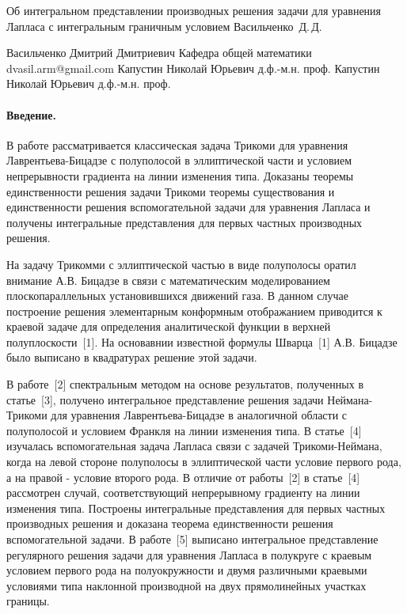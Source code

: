 \begin{vkrthesis}%
{Об интегральном представлении производных решения задачи для уравнения Лапласа с интегральным граничным условием}%
{Васильченко~Д.\,Д.}%

\VKRAuthorDetailsSupervisorConsultant%
{Васильченко Дмитрий Дмитриевич}%
{Кафедра общей математики}%
{dvasil.arm@gmail.com}%
{Капустин Николай Юрьевич}%
{ д.ф.-м.н.}%
{проф.}%
{Капустин Николай Юрьевич}%
{д.ф.-м.н.}%
{проф.}%
{}%

\newcommand{\tbs}{\textbackslash}

\paragraph{Введение.}
В работе рассматривается классическая задача Трикоми для уравнения Лаврентьева-Бицадзе с полуполосой в эллиптической части и условием непрерывности градиента на линии изменения типа. Доказаны теоремы единственности решения задачи Трикоми теоремы существования и единственности решения вспомогательной задачи для уравнения Лапласа и получены интегральные представления для первых частных производных решения.

\par
На задачу Трикомми с эллиптической частью в виде полуполосы оратил внимание А.В. Бицадзе в связи с математическим моделированием плоскопараллельных установившихся движений газа. В данном случае построение решения элементарным конформным отображанием приводится к краевой задаче для определения аналитической функции в верхней полуплоскости~[1]. На основавнии известной формулы Шварца~[1] А.В. Бицадзе было выписано в квадратурах решение этой задачи.

\par
В работе~[2] спектральным методом на основе результатов, полученных в статье~[3], получено интегральное представление решения задачи Неймана-Трикоми для уравнения Лаврентьева-Бицадзе в аналогичной области с полуполосой и условием Франкля на линии изменения типа. В статье~[4] изучалась вспомогательная задача Лапласа связи с задачей Трикоми-Неймана, когда на левой стороне полуполосы в эллиптической части условие первого рода, а на правой - условие второго рода. В отличие от работы~[2] в статье~[4] рассмотрен случай, соответствующий непрерывному градиенту на линии изменения типа. Построены интегральные представления для первых частных производных решения и доказана теорема единственности решения вспомогательной задачи. В работе~[5] выписано интегральное представление регулярного решения задачи для уравнения Лапласа в полукруге с краевым условием первого рода на полуокружности и двумя различными краевыми условиями типа наклонной производной на двух прямолинейных участках границы.


\end{vkrthesis}
